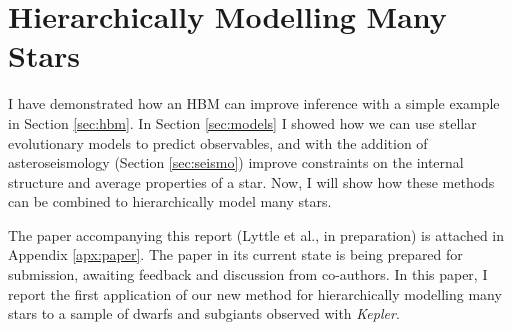 \chapter{Hierarchically Modelling Many Stars}\label{ch:paper}

I have demonstrated how an HBM can improve inference with a simple example in Section \ref{sec:hbm}. In Section \ref{sec:models} I showed how we can use stellar evolutionary models to predict observables, and with the addition of asteroseismology (Section \ref{sec:seismo}) improve constraints on the internal structure and average properties of a star. Now, I will show how these methods can be combined to hierarchically model many stars.

The paper accompanying this report (Lyttle et al., in preparation) is attached in Appendix \ref{apx:paper}. The paper in its current state is being prepared for submission, awaiting feedback and discussion from co-authors. In this paper, I report the first application of our new method for hierarchically modelling many stars to a sample of dwarfs and subgiants observed with \emph{Kepler}.

